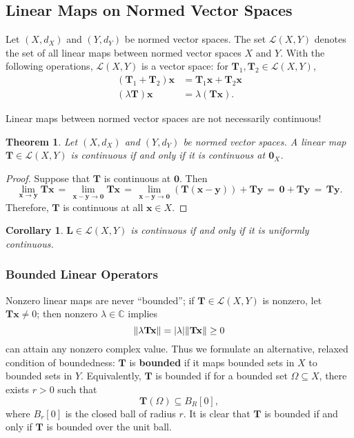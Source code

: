 \documentclass[11pt]{article}
\newtheorem{theorem}{Theorem}
\newtheorem{corollary}{Corollary}
\renewcommand{\vec}[1]{\mathbf{#1}}
\newcommand{\mat}[1]{\mathbf{#1}}
\begin{document}
\newpage


\subsection{Linear Maps on Normed Vector Spaces}

Let $(X, d_{X})$ and $(Y, d_{Y})$ be normed vector spaces. The set $\mathcal{L}(X, Y)$ denotes the set of all linear maps between normed vector spaces $X$ and $Y$. With the following operations, $\mathcal{L}(X, Y)$ is a vector space: for $\mat{T}_{1}, \mat{T}_{2} \in \mathcal{L}(X, Y)$,
\begin{align*}
  (\mat{T}_{1} + \mat{T}_{2})\vec{x} &= \mat{T}_{1} \vec{x} + \mat{T}_{2} \vec{x} \\
           (\lambda \mat{T}) \vec{x} &= \lambda (\mat{T} \vec{x}).
\end{align*}

Linear maps between normed vector spaces are not necessarily continuous!

\begin{theorem}
  Let $(X, d_{X})$ and $(Y, d_{Y})$ be normed vector spaces. A linear map $\mat{T} \in \mathcal{L}(X, Y)$ is continuous if and only if it is continuous at $\vec{0}_{X}$.
\end{theorem}
\begin{adjustwidth}{0.5cm}{}
  \begin{proof}
    Suppose that $\mat{T}$ is continuous at $\vec{0}$. Then
    \[
      \lim\limits_{\vec{x} \to \vec{y}} \mat{T} \vec{x} \, = \,  \lim\limits_{\vec{x} - \vec{y} \to \vec{0}} \mat{T} \vec{x} \, = \, \lim\limits_{\vec{x} - \vec{y} \to \vec{0}} (\mat{T}(\vec{x} - \vec{y})) + \mat{T} \vec{y} \, = \, \vec{0} + \mat{T}\vec{y} \, = \, \mat{T} \vec{y}.
    \]
    Therefore, $\mat{T}$ is continuous at all $\vec{x} \in X$.
  \end{proof}
\end{adjustwidth}
\begin{corollary}
  $\mat{L} \in \mathcal{L}(X, Y)$ is continuous if and only if it is uniformly continuous.
\end{corollary}

\subsubsection*{Bounded Linear Operators}

Nonzero linear maps are never ``bounded''; if $\mat{T} \in \mathcal{L}(X, Y)$ is nonzero, let $\mat{T} \vec{x} \ne 0$; then nonzero $\lambda \in \mathbb{C}$ implies
\[
  \norm{\lambda \mat{T}\vec{x}} = \abs{\lambda} \norm{\mat{T} \vec{x}} \ge 0
\]
can attain any nonzero complex value. Thus we formulate an alternative, relaxed condition of boundedness: $\mat{T}$ is \textbf{bounded} if it maps bounded sets in $X$ to bounded sets in $Y$. Equivalently, $\mat{T}$ is bounded if for a bounded set $\Omega \subseteq X$, there exists $r > 0$ such that
\[
  \mat{T}(\Omega) \subseteq B_{R}[0],
\]
where $B_{r}[0]$ is the closed ball of radius $r$. It is clear that $\mat{T}$ is bounded if and only if $\mat{T}$ is bounded over the unit ball.
\end{document}
